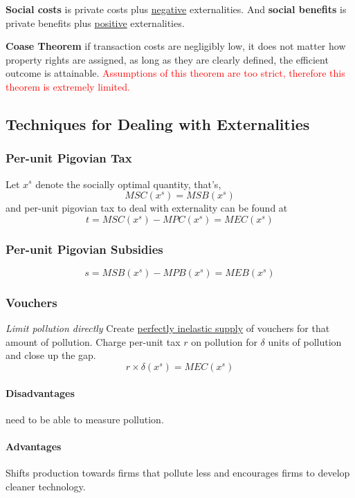 \documentclass[]{article}
\begin{document}
            \begin{definition}
                \textbf{Social costs} is private costs plus \ul{negative} externalities. And \textbf{social benefits} is private benefits plus \ul{positive} externalities.
            \end{definition}
            
            \begin{theorem}
                \textbf{Coase Theorem} if transaction costs are negligibly low, it does not matter how property rights are assigned, as long as they are clearly defined, the efficient outcome is attainable. \textcolor{red}{Assumptions of this theorem are too strict, therefore this theorem is extremely limited.}
            \end{theorem}
        
        \subsection{Techniques for Dealing with Externalities}
            \subsubsection{Per-unit Pigovian Tax}
                \par Let $x^s$ denote the socially optimal quantity, that's, 
                \[
                    MSC(x^s) = MSB(x^s)
                \]
                and per-unit pigovian tax to deal with externality can be found at
                \[
                    t = MSC(x^s) - MPC(x^s) = MEC(x^s)
                \]
            
            \subsubsection{Per-unit Pigovian Subsidies}
                \[
                    s = MSB(x^s) - MPB(x^s) = MEB(x^s)
                \]
            
            \subsubsection{Vouchers}
                \par \emph{Limit pollution directly} Create \ul{perfectly inelastic supply} of vouchers for that amount of pollution. Charge per-unit tax $r$ on pollution for $\delta$ units of pollution and close up the gap.
                \[
                    r \times \delta(x^s) = MEC(x^s)
                \]
                \paragraph{Disadvantages} need to be able to measure pollution.
                \paragraph{Advantages} Shifts production towards firms that pollute less and encourages firms to develop cleaner technology.
\end{document}
